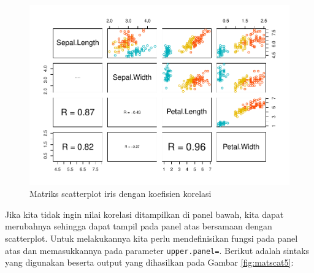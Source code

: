 \documentclass[]{book}
\newenvironment{Shaded}{\begin{snugshade}}{\end{snugshade}}
\newcommand{\KeywordTok}[1]{\textcolor[rgb]{0.13,0.29,0.53}{\textbf{#1}}}
\newcommand{\DataTypeTok}[1]{\textcolor[rgb]{0.13,0.29,0.53}{#1}}
\newcommand{\DecValTok}[1]{\textcolor[rgb]{0.00,0.00,0.81}{#1}}
\newcommand{\FloatTok}[1]{\textcolor[rgb]{0.00,0.00,0.81}{#1}}
\newcommand{\StringTok}[1]{\textcolor[rgb]{0.31,0.60,0.02}{#1}}
\newcommand{\CommentTok}[1]{\textcolor[rgb]{0.56,0.35,0.01}{\textit{#1}}}
\newcommand{\OtherTok}[1]{\textcolor[rgb]{0.56,0.35,0.01}{#1}}
\newcommand{\ControlFlowTok}[1]{\textcolor[rgb]{0.13,0.29,0.53}{\textbf{#1}}}
\newcommand{\OperatorTok}[1]{\textcolor[rgb]{0.81,0.36,0.00}{\textbf{#1}}}
\newcommand{\NormalTok}[1]{#1}
\begin{document}
\begin{figure}

{\centering \includegraphics[width=0.8\linewidth]{EnvStat_files/figure-latex/matscat4-1} 

}

\caption{Matriks scatterplot iris dengan koefisien korelasi}\label{fig:matscat4}
\end{figure}

Jika kita tidak ingin nilai korelasi ditampilkan di panel bawah, kita
dapat merubahnya sehingga dapat tampil pada panel atas bersamaan dengan
scatterplot. Untuk melakukannya kita perlu mendefinisikan fungsi pada
panel atas dan memasukkannya pada parameter \texttt{upper.panel=}.
Berikut adalah sintaks yang digunakan beserta output yang dihasilkan
pada Gambar \ref{fig:matscat5}:

\begin{Shaded}
\end{Shaded}
\end{document}
